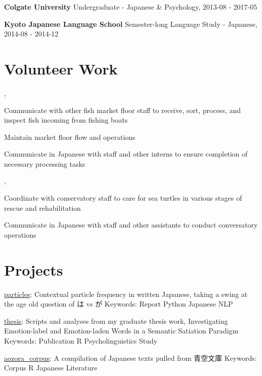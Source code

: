 \documentclass[letterpaper]{deedy-resume_sm}
\begin{document}
\textbf{Colgate University}
Undergraduate - Japanese \& Psychology, 2013-08 - 2017-05

\textbf{Kyoto Japanese Language School}
Semester-long Language Study - Japanese, 2014-08 - 2014-12

\section{Volunteer Work}
, 
\begin{tightitemize}
\item Communicate with other fish market floor staff to receive, sort, process, and inspect fish incoming from fishing boats
\item Maintain market floor flow and operations
\item Communicate in Japanese with staff and other interns to ensure completion of necessary processing tasks
\end{tightitemize}
\sectionspace

, 
\begin{tightitemize}
\item Coordinate with conservatory staff to care for sea turtles in various stages of rescue and rehabilitation
\item Communicate in Japanese with staff and other assistants to conduct conversatory operations
\end{tightitemize}
\sectionspace

\section{Projects}
\href{https://github.com/ryancahildebrandt/particles}{particles}: Contextual particle frequency in written Japanese, taking a swing at the age old question of は vs が
Keywords: Report \textbullet{} Python \textbullet{} Japanese \textbullet{} NLP

\href{https://github.com/ryancahildebrandt/thesis}{thesis}: Scripts and analyses from my graduate thesis work, Investigating Emotion-label and Emotion-laden Words in a Semantic Satiation Paradigm
Keywords: Publication \textbullet{} R \textbullet{} Psycholinguistics \textbullet{} Study

\href{https://github.com/ryancahildebrandt/aozora_corpus}{aozora{\_}corpus}: A compilation of Japanese texts pulled from 青空文庫
Keywords: Corpus \textbullet{} R \textbullet{} Japanese \textbullet{} Literature
\end{document}
